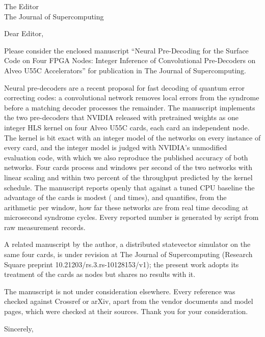 \documentclass[11pt]{letter}
\begin{document}
\begin{letter}{The Editor\\The Journal of Supercomputing}
\opening{Dear Editor,}

Please consider the enclosed manuscript ``Neural Pre-Decoding for the Surface Code on Four FPGA Nodes: Integer
Inference of Convolutional Pre-Decoders on Alveo U55C Accelerators'' for publication in The Journal of Supercomputing.

Neural pre-decoders are a recent proposal for fast decoding of quantum error correcting codes: a convolutional network
removes local errors from the syndrome before a matching decoder processes the remainder. The manuscript implements
the two pre-decoders that NVIDIA released with pretrained weights as one integer HLS kernel on four Alveo U55C cards,
each card an independent node. The kernel is bit exact with an integer model of the networks on every instance of
every card, and the integer model is judged with NVIDIA's unmodified evaluation code, with which we also reproduce the
published accuracy of both networks. Four cards process \NumFourFast{} and \NumFourAcc{} windows per second of the
two networks with linear scaling and within two percent of the throughput predicted by the kernel schedule. The
manuscript reports openly that against a tuned CPU baseline the advantage of the cards is modest
(\NumSpeedFast{} and \NumSpeedAcc{} times), and quantifies, from the arithmetic per window, how far these networks are
from real time decoding at microsecond syndrome cycles. Every reported number is generated by script from raw measurement records.

A related manuscript by the author, a distributed statevector simulator on the same four cards, is under revision at
The Journal of Supercomputing (Research Square preprint 10.21203/rs.3.rs-10128153/v1); the present work adopts its
treatment of the cards as nodes but shares no results with it.

The manuscript is not under consideration elsewhere. Every reference was checked against Crossref or arXiv, apart from
the vendor documents and model pages, which were checked at their sources. Thank you for your consideration.

\closing{Sincerely,}
\end{letter}
\end{document}
